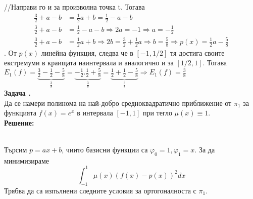 \documentclass[12pt]{article}
\newcounter{problem}
\newcounter{solution}
\newcommand\problem{%
  \stepcounter{problem}%
  \textbf{Задача \theproblem.}~%
  \\
}
\newcommand\solution{%
  \textbf{Решение:}\\~%
}
\begin{document}
        //Направи го и за произволна точка t.
        Тогава
        \begin{align*}
        \frac{3}{2} + a - b &= \frac{1}{2}a + b = \frac{1}{2} - a - b\\
        \frac{3}{2} + a - b &=\frac{1}{2} - a - b\Rightarrow 2a = -1 
        \Rightarrow \boxed{a = -\frac{1}{2}}\\
        \frac{3}{2} + a - b &= \frac{1}{2}a + b \Rightarrow 2b = \frac{3}{2} + \frac{1}{2}a \Rightarrow \boxed{b = \frac{5}{8}}
        \Rightarrow p(x) = \frac{1}{2}a-\frac{5}{8}
        \end{align*}.
        От $p(x)$ линейна функция, следва че в $[-1,1/2]$ тя достига своите екстремуми в краищата наинтервала и аналогично и за $[1/2,1]$.
        Тогава $E_1(f) = \underbrace{\frac{3}{2} -\frac{1}{2} - \frac{5}{8}}_{\frac{3}{8}} = \underbrace{-\frac{1}{2}.\frac{1}{2} + \frac{5}{8}}_\frac{3}{8} = \underbrace{\frac{1}{2} + \frac{1}{2} - \frac{5}{8}}_\frac{3}{8}\Rightarrow E_1(f)=\frac{3}{8}$\\
    \problem
        Да се намери полинома на най-добро средноквадратично приближение от $\pi_1$ за функцията $f(x) = e^x$ в интервала $[-1,1]$ при тегло $\mu(x)\equiv1.$\\
    \solution
        Търсим $p=ax+b$, чиито базисни функции са $\varphi_0=1, \varphi_1=x$.
        За да минимизираме
        \begin{equation*}
        \int_{-1}^{1}\mu(x)(f(x)-p(x))^2dx
        \end{equation*}
        Трябва да са изпълнени следните условия за ортогоналноста с $\pi_1$.
\end{document}
